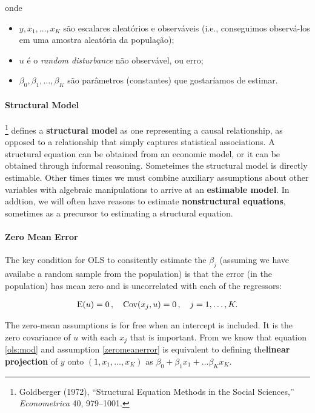 \documentclass[11pt, oneside, a4paper, article]{article}
\numberwithin{equation}{section}
\begin{document}
\noindent
onde

\begin{itemize} \itemsep0pt
\item $y, x_{1}, \dots, x_{K}$  são escalares aleatórios e observáveis (i.e., conseguimos observá-los em uma amostra aleatória da população);

\item $u$ é o \textit{random disturbance} não observável, ou erro; 

\item $\beta_{0}, \beta_{1}, \dots, \beta_{K}$ são parâmetros (constantes) que gostaríamos de estimar.
\end{itemize}

\paragraph{Structural Model}
\footnote{Goldberger (1972), ``Structural Equation Methods in the Social Sciences,'' \textit{Econometrica} 40, 979--1001.}
defines a \textbf{structural model} as one representing a causal relationship, as opposed to a relationship that simply captures statistical associations.
A structural equation can be obtained from an economic model, or it can be obtained through informal reasoning.
Someteimes the structural model is directly estimable.
Other times times we must combine auxiliary assumptions about other variables with algebraic manipulations to arrive at an \textbf{estimable model}.
In addtion, we will often have reasons to estimate \textbf{nonstructural equations}, sometimes as a precursor to estimating a structural equation.

\paragraph{Zero Mean Error}
The key condition for OLS to consitently estimate the $\beta_{j}$ (assuming we have availabe a random sample from the population) is that the error (in the population) has mean zero and is uncorrelated with each of the regressors:

\vspace{-1 em}
\begin{align} \label{zeromeanerror}
	\text{E}( u ) = 0 \, , \quad \text{Cov}(x_{j}, u) = 0 \, , \quad j = 1, \dots, K.
\end{align}

The zero-mean assumptions is for free when an intercept is included.
It is the zero covariance of $u$ with each $x_{j}$ that is important.
From  we know that equation \eqref{ols:mod} and assumption \eqref{zeromeanerror} is equivalent to defining the\textbf{linear projection} of $y$ onto 
$(1, x_{1}, \dots, x_{K})$ as
$\beta_{0} + \beta_{1} x_{1} + \dots \beta_{K} x_{K}$.
\end{document}
